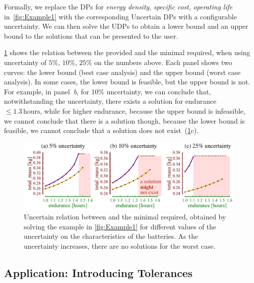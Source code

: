 Formally, we replace the DPs for\emph{ energy density}, \emph{specific
cost}, \emph{operating life} in~\cref{fig:Example1} with the
corresponding Uncertain DPs with a configurable uncertainty. We can
then solve the UDPs to obtain a lower bound and an upper bound to
the solutions that can be presented to the user.

\cref{fig:unc_battery_uncertain} shows the relation between
the provided  and the minimal  required,
when using uncertainty of $5\%$, $10\%$, $25\%$ on the numbers
above. Each panel shows two curves: the lower bound (best case analysis)
and the upper bound (worst case analysis). In some cases, the lower
bound is feasible, but the upper bound is not. For example, in panel~\emph{b},
for 10\% uncertainty, we can conclude that, notwithstanding the uncertainty,
there exists a solution for endurance~$\leq1.3\,\text{hours}$, while
for higher endurance, because the upper bound is infeasible, we cannot
conclude that there is a solution \textemdash{} though, because the
lower bound is feasible, we cannot conclude that a solution does not
exist~(\cref{fig:unc_battery_uncertain}c).
\begin{center}
\begin{figure}[h]
\begin{centering}
\includegraphics[scale=0.33]{unc_battery_uncertain}
\par\end{centering}
\caption{\label{fig:unc_battery_uncertain}Uncertain relation between 
and the minimal  required, obtained by solving the
example in \cref{fig:Example1} for different values of the uncertainty
on the characteristics of the batteries. As the uncertainty increases,
there are no solutions for the worst case.}
\end{figure}
\par\end{center}

\subsection{Application: Introducing Tolerances\label{sec:Application-tolerance}}

